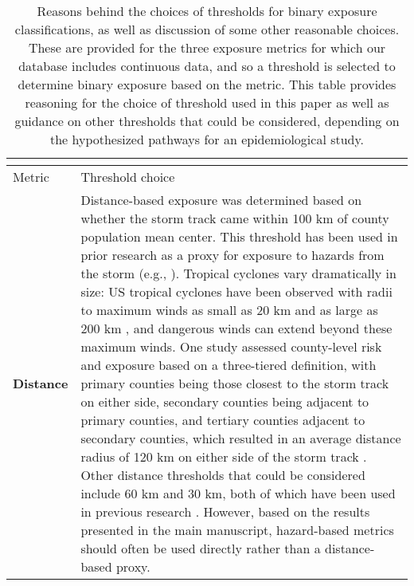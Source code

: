 \begin{longtable}{lp{35em}}
\caption{Reasons behind the choices of thresholds for binary exposure classifications, as well as discussion of some other reasonable choices. These are provided for the three exposure metrics for which our database includes continuous data, and so a threshold is selected to determine binary exposure based on the metric. This table provides reasoning for the choice of threshold used in this paper as well as guidance on other thresholds that could be considered, depending on the hypothesized pathways for an epidemiological study.} \\
\label{tab:thresholds} \\
\hline
Metric & Threshold choice\\
\hline
\textbf{Distance} & Distance-based exposure was determined based on whether the storm track came within 100 km of county population mean center. This threshold has been used in prior research as a proxy for exposure to hazards from the storm (e.g., \cite{grabich2015measuring}). Tropical cyclones vary dramatically in size: US tropical cyclones have been observed with radii to maximum winds as small as 20 km and as large as 200 km \parencite{mallin2006, quiring2011variations}, and dangerous winds can extend beyond these maximum winds. One study assessed county-level risk and exposure based on a three-tiered definition, with primary counties being those closest to the storm track on either side, secondary counties being adjacent to primary counties, and tertiary counties adjacent to secondary counties, which resulted in an average distance radius of 120 km on either side of the storm track \parencite{czajkowski2011}. Other distance thresholds that could be considered include 60 km and 30 km, both of which have been used in previous research \parencite{grabich2015measuring, grabich2015, currie2013}. However, based on the results presented in the main manuscript, hazard-based metrics should often be used directly rather than a distance-based proxy.\\


\end{longtable}
